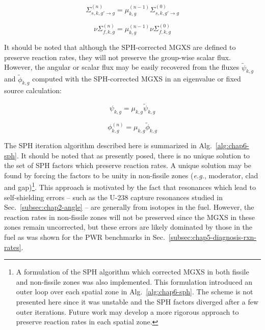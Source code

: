 \begin{dmath}
\label{eqn:chap6-sph-update-sigs}
\Sigma_{s,k,g'\rightarrow g}^{(n)} = \mu_{k,g}^{(n-1)}\Sigma_{s,k,g'\rightarrow g}^{(0)}
\end{dmath}

\begin{dmath}
\label{eqn:chap6-sph-update-nusigf}
\nu\Sigma_{f,k,g}^{(n)} = \mu_{k,g}^{(n-1)}\nu\Sigma_{f,k,g}^{(0)}
\end{dmath}

It should be noted that although the \ac{SPH}-corrected \ac{MGXS} are defined to preserve reaction rates, they will not preserve the group-wise scalar flux. However, the angular or scalar flux may be easily recovered from the fluxes $\tilde{\psi}_{k,g}$ and $\tilde{\phi}_{k,g}$ computed with the \ac{SPH}-corrected \ac{MGXS} in an eigenvalue or fixed source calculation:

\begin{dmath}
\label{eqn:chap6-sph-update-angular-flux}
\psi_{k,g} = \mu_{k,g}\tilde{\psi}_{k,g}
\end{dmath}

\begin{dmath}
\label{eqn:chap6-sph-update-scalar-flux}
\phi_{k,g}^{(n)} = \mu_{k,g}\tilde{\phi}_{k,g}
\end{dmath}

The \ac{SPH} iteration algorithm described here is summarized in Alg.~\ref{alg:chap6-sph}. It should be noted that as presently posed, there is no unique solution to the set of \ac{SPH} factors which preserve reaction rates. A unique solution may be found by forcing the factors to be unity in non-fissile zones (\textit{e.g.}, moderator, clad and gap)\footnote{A formulation of the \ac{SPH} algorithm which corrected \ac{MGXS} in both fissile and non-fissile zones was also implemented. This formulation introduced an outer loop over each spatial zone in Alg.~\ref{alg:chap6-sph}. The scheme is not presented here since it was unstable and the \ac{SPH} factors diverged after a few outer iterations. Future work may develop a more rigorous approach to preserve reaction rates in each spatial zone.}. This approach is motivated by the fact that resonances which lead to self-shielding errors -- such as the U-238 capture resonances studied in Sec.~\ref{subsec:chap2-angle} -- are generally from isotopes in the fuel. However, the reaction rates in non-fissile zones will not be preserved since the \ac{MGXS} in these zones remain uncorrected, but these errors are likely dominated by those in the fuel as was shown for the \ac{PWR} benchmarks in Sec.~\ref{subsec:chap5-diagnosis-rxn-rates}.

